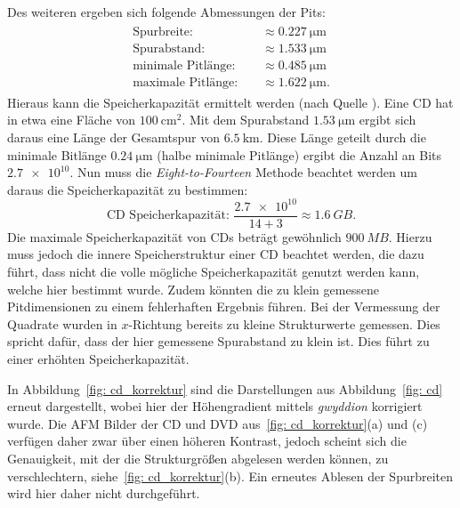 Des weiteren ergeben sich folgende Abmessungen der Pits:
\begin{align}
  \begin{aligned}
    \text{Spurbreite: } &     &\approx  \SI{0.227}{\micro\meter}\\
    \text{Spurabstand: } &        &\approx \SI{1.533}{\micro\meter} \\
    \text{minimale Pitlänge: } &     &\approx \SI{0.485}{\micro\meter} \\
    \text{maximale Pitlänge: } &    &\approx \SI{1.622}{\micro\meter}.
  \end{aligned}
\end{align}
Hieraus kann die Speicherkapazität ermittelt werden (nach Quelle \cite{afm_datasheet}). Eine CD hat in etwa eine Fläche von $\SI{100}{\centi\meter\squared}$. Mit dem Spurabstand
$\SI{1.53}{\micro\meter}$ ergibt sich daraus
eine Länge der Gesamtspur von $\SI{6.5}{\kilo\meter}$. Diese Länge geteilt durch die minimale Bitlänge $\SI{0.24}{\micro\meter}$
(halbe minimale Pitlänge) ergibt die Anzahl an Bits $\num{2.7e10}$.
Nun muss die \textit{Eight-to-Fourteen}
Methode beachtet werden um daraus die Speicherkapazität zu bestimmen:
\begin{equation}
  \text{CD Speicherkapazität: } \frac{\num{2.7e10}}{14 + 3} \approx \SI{1.6}{GB}.
\end{equation}
Die maximale Speicherkapazität von CDs beträgt gewöhnlich $\SI{900}{MB}$. Hierzu muss jedoch die innere Speicherstruktur einer CD beachtet werden, die dazu führt,
dass nicht die volle mögliche Speicherkapazität genutzt werden kann, welche hier bestimmt wurde. Zudem könnten die zu klein gemessene Pitdimensionen
zu einem fehlerhaften Ergebnis führen. Bei der Vermessung der Quadrate wurden in $x$-Richtung bereits zu kleine Strukturwerte gemessen. Dies spricht dafür,
dass der hier gemessene Spurabstand zu klein ist. Dies führt zu einer erhöhten Speicherkapazität.

In Abbildung~\ref{fig: cd_korrektur} sind die Darstellungen aus Abbildung~\ref{fig: cd} erneut dargestellt, wobei hier der
Höhengradient mittels \emph{gwyddion} korrigiert wurde. Die AFM
Bilder der CD und DVD aus~\ref{fig: cd_korrektur}(a) und (c) verfügen daher zwar über einen höheren Kontrast, jedoch
scheint sich die Genauigkeit, mit der die Strukturgrößen abgelesen werden können, zu verschlechtern, siehe~\ref{fig: cd_korrektur}(b).
Ein erneutes Ablesen der Spurbreiten wird hier daher nicht durchgeführt.

